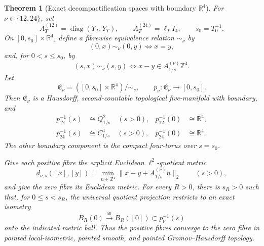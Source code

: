 \documentclass[11pt,letterpaper]{article}
\numberwithin{equation}{section}
\newtheorem{theorem}{Theorem}[section]
\theoremstyle{definition}
\theoremstyle{remark}
\newcommand{\R}{\mathbb R}
\newcommand{\Z}{\mathbb Z}
\begin{document}
\begin{theorem}[Exact decompactification spaces with boundary \(\R^4\)]
\label{thm:exact-decompactification}
For \(\nu\in\{12,24\}\), set
\[
 A_T^{(12)}=\operatorname{diag}(Y_T,Y_T),\qquad
 A_T^{(24)}=\ell_T I_4,\qquad s_0=T_0^{-1}.
\]
On \([0,s_0]\times\R^4\), define a fibrewise equivalence relation
\(\sim_\nu\) by
\[
 (0,x)\sim_\nu(0,y)\iff x=y,
\]
and, for \(0<s\leq s_0\), by
\[
 (s,x)\sim_\nu(s,y)\iff
 x-y\in A_{1/s}^{(\nu)}\Z^4.
\]
Let
\[
 \mathfrak E_\nu=([0,s_0]\times\R^4)/\!\sim_\nu,
 \qquad
 p_\nu:\mathfrak E_\nu\longrightarrow[0,s_0].
\]
Then \(\mathfrak E_\nu\) is a Hausdorff, second-countable topological
five-manifold with boundary, and
\begin{align}
 p_{12}^{-1}(s)&\cong Q_{1/s}^2\quad(s>0),
 &p_{12}^{-1}(0)&\cong\R^4,
 \label{eq:E12-fibres}\\
 p_{24}^{-1}(s)&\cong C_{1/s}^4\quad(s>0),
 &p_{24}^{-1}(0)&\cong\R^4.
 \label{eq:E24-fibres}
\end{align}
The other boundary component is the compact four-torus over \(s=s_0\).

Give each positive fibre the explicit Euclidean \(\ell^2\)-quotient metric
\begin{equation}
 d_{\nu,s}([x],[y])
 =\min_{n\in\Z^4}
 \|x-y+A_{1/s}^{(\nu)}n\|_2
 \qquad(s>0),
 \label{eq:E-fibre-metric}
\end{equation}
and give the zero fibre its Euclidean metric.  For every \(R>0\), there is
\(s_R>0\) such that, for \(0\leq s<s_R\), the universal quotient
projection restricts to an exact isometry
\[
 \overline B_R(0)
 \xrightarrow{\ \cong\ }
 \overline B_R([0])\subset p_\nu^{-1}(s)
\]
onto the indicated metric ball.  Thus the positive fibres converge to the zero fibre in pointed
local-isometric, pointed smooth, and pointed Gromov--Hausdorff topology.


\end{theorem}
\end{document}
